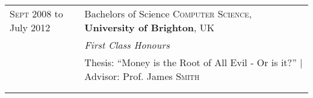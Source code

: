 \documentclass[a4paper,10pt]{article} %
\begin{document}
\begin{tabular}{ L{2cm} | L{11cm}}	
\textsc{Sept} 2008 to July 2012  & Bachelors of Science \textsc{Computer Science}, \textbf{University of Brighton}, UK\\
& \small\emph{First Class Honours} \\
& Thesis: ``Money is the Root of All Evil - Or is it?'' | \small Advisor: Prof. James \textsc{Smith}\\
&\normalsize \\
&\\


%
%
%
%

\end{tabular}

%
%
%
\end{document}
